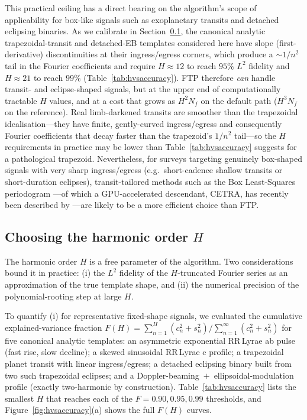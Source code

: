 \documentclass[apj]{emulateapj}
\begin{document}
This practical ceiling has a direct bearing on the algorithm's scope of
applicability for box-like signals such as exoplanetary transits and
detached eclipsing binaries.  As we calibrate in
Section~\ref{sec:choiceH}, the canonical analytic trapezoidal-transit and
detached-EB templates considered here have slope (first-derivative)
discontinuities at their ingress/egress corners, which produce a
$\sim 1/n^2$ tail in the Fourier coefficients and require
$H \approx 12$ to reach $95\%$ $L^2$ fidelity and $H \approx 21$ to
reach $99\%$ (Table~\ref{tab:hvsaccuracy}).  FTP therefore \emph{can}
handle transit- and eclipse-shaped signals, but at the upper end of
computationally tractable $H$ values, and at a cost that grows as
$H^2 N_f$ on the default path ($H^3 N_f$ on the reference).  Real
limb-darkened transits are smoother than the
trapezoidal idealisation---they have finite, gently-curved
ingress/egress and consequently Fourier coefficients that decay
faster than the trapezoid's $1/n^2$ tail---so the $H$ requirements
in practice may be lower than Table~\ref{tab:hvsaccuracy} suggests
for a pathological trapezoid.  Nevertheless, for surveys targeting
genuinely box-shaped signals with very sharp ingress/egress
(e.g.\ short-cadence shallow transits or short-duration eclipses),
transit-tailored methods such as the Box Least-Squares periodogram
\citep[BLS,][]{Kovacs_2002}---of which a GPU-accelerated
descendant, CETRA, has recently been described by \citet{Smith_etal_2025}---are
likely to be a more efficient choice than FTP.


\subsection{Choosing the harmonic order \texorpdfstring{$H$}{H}}\label{sec:choiceH}

The harmonic order $H$ is a free parameter of the algorithm.  Two
considerations bound it in practice:  (i) the $L^2$ fidelity of the
$H$-truncated Fourier series as an approximation of the true template
shape, and (ii) the numerical precision of the polynomial-rooting
step at large $H$.

To quantify (i) for representative fixed-shape signals, we evaluated
the cumulative explained-variance fraction
$F(H) = \sum_{n=1}^H (c_n^2 + s_n^2) / \sum_{n=1}^{\infty} (c_n^2 + s_n^2)$
for five canonical analytic templates: an asymmetric exponential
RR\,Lyrae ab pulse (fast rise, slow decline); a skewed sinusoidal
RR\,Lyrae c profile; a trapezoidal planet transit with linear
ingress/egress; a detached eclipsing binary built from two such
trapezoidal eclipses; and a Doppler-beaming$\;+\;$ellipsoidal-modulation
profile (exactly two-harmonic by construction).  Table~\ref{tab:hvsaccuracy}
lists the smallest $H$ that reaches each of the
$F = 0.90, 0.95, 0.99$ thresholds, and Figure~\ref{fig:hvsaccuracy}(a)
shows the full $F(H)$ curves.
\end{document}
